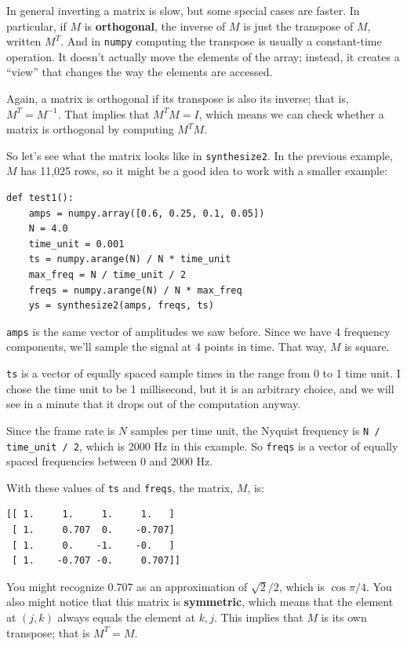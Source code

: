 \documentclass[12pt]{book}
\begin{document}
In general inverting a matrix is slow, but some special cases are
faster.  In particular, if $M$ is {\bf orthogonal}, the inverse of $M$
is just the transpose of $M$, written $M^T$.  And in {\tt numpy}
computing the transpose is usually a constant-time operation.  It
doesn't actually move the elements of the array; instead, it creates a
``view'' that changes the way the elements are accessed.

Again, a matrix is orthogonal
if its transpose is also
its inverse; that is, $M^T = M^{-1}$.  That implies that $M^TM = I$,
which means we can check whether a matrix is orthogonal by computing
$M^TM$.

So let's see what the matrix looks like in {\tt synthesize2}.  In 
the previous example, $M$ has 11,025 rows, so it might be a good idea
to work with a smaller example:

\begin{verbatim}
def test1():
    amps = numpy.array([0.6, 0.25, 0.1, 0.05])
    N = 4.0
    time_unit = 0.001
    ts = numpy.arange(N) / N * time_unit
    max_freq = N / time_unit / 2
    freqs = numpy.arange(N) / N * max_freq
    ys = synthesize2(amps, freqs, ts)
\end{verbatim}

{\tt amps} is the same vector of amplitudes we saw before.
Since we have 4 frequency components, we'll sample the signal
at 4 points in time.  That way, $M$ is square.

{\tt ts} is a vector of equally spaced sample times in the range from
0 to 1 time unit.  I chose the time unit to be 1 millisecond, but it
is an arbitrary choice, and we will see in a minute that it drops out
of the computation anyway.

Since the frame rate is $N$ samples per time unit, the Nyquist
frequency is \verb"N / time_unit / 2", which is 2000 Hz in this
example.  So {\tt freqs} is a vector of equally spaced frequencies
between 0 and 2000 Hz.

With these values of {\tt ts} and {\tt freqs}, the matrix, $M$, is:

\begin{verbatim}
[[ 1.     1.     1.     1.   ]
 [ 1.     0.707  0.    -0.707]
 [ 1.     0.    -1.    -0.   ]
 [ 1.    -0.707 -0.     0.707]]
\end{verbatim}

You might recognize 0.707 as an approximation of $\sqrt{2}/2$,
which is $\cos \pi/4$.  You also might notice that this matrix
is {\bf symmetric}, which means that the element at $(j, k)$ always
equals the element at $k, j$.  This implies that $M$ is its own
transpose; that is $M^T = M$.
\end{document}
